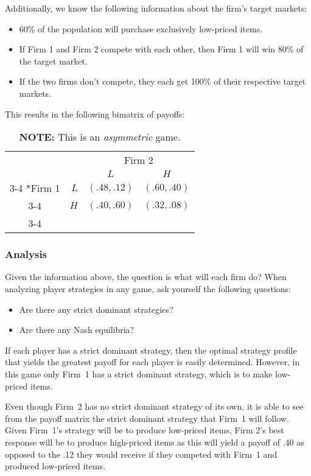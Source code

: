 \documentclass[twoside]{article}
\begin{document}
Additionally, we know the following information about the firm's target markets:

\begin{itemize}
    \item 60\% of the population will purchase exclusively low-priced items.
    \item If Firm 1 and Firm 2 compete with each other, then Firm 1 will win 80\% of the target market.
    \item If the two firms don't compete, they each get 100\% of their respective target markets.
\end{itemize}

This results in the following bimatrix of payoffs:

\begin{table}[h]
\centering
\renewcommand{\arraystretch}{1.5}
\begin{tabular}{cr|c|c|}
& \multicolumn{1}{c}{} & \multicolumn{2}{c}{Firm 2} \\
& \multicolumn{1}{c}{} & \multicolumn{1}{c}{$L$} & \multicolumn{1}{c}{$H$} \\ \cline{3-4}
\multirow{2}*{Firm 1}  & $L$ & $(.48, .12)$ & $(.60, .40)$ \\ \cline{3-4}
& $H$ & $(.40, .60)$ & $(.32, .08)$ \\ \cline{3-4}
\end{tabular}
\caption*{\textbf{NOTE:} This is an \textit{asymmetric} game.}
\end{table}

\subsubsection{Analysis}
Given the information above, the question is what will each firm do? When analyzing player strategies in any game, ask yourself the following questions:

\begin{itemize}
    \item Are there any strict dominant strategies?
    \item Are there any Nash equilibria?
\end{itemize}

If each player has a strict dominant strategy, then the optimal strategy profile that yields the greatest payoff for each player is easily determined. However, in this game only Firm~1 has a strict dominant strategy, which is to make low-priced items.

Even though Firm~2 has no strict dominant strategy of its own, it is able to see from the payoff matrix the strict dominant strategy that Firm~1 will follow. Given Firm~1's strategy will be to produce low-priced items, Firm 2's best response will be to produce high-priced items as this will yield a payoff of .40 as opposed to the .12 they would receive if they competed with Firm~1 and produced low-priced items.
\end{document}
